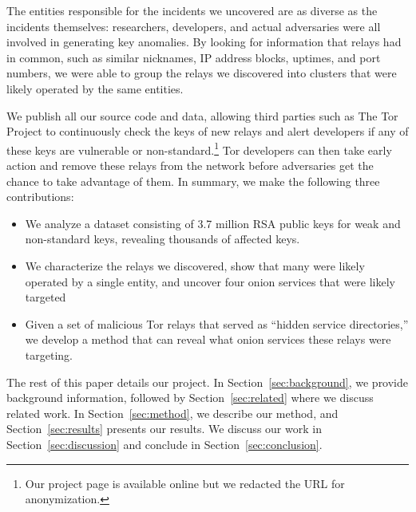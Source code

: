 The entities responsible for the incidents we uncovered are as diverse as the
incidents themselves: researchers, developers, and actual adversaries were all
involved in generating key anomalies.  By looking for information that relays
had in common, such as similar nicknames, IP address blocks, uptimes, and port
numbers, we were able to group the relays we discovered into clusters that were
likely operated by the same entities.

We publish all our source code and data, allowing third parties such as The Tor
Project to continuously check the keys of new relays and alert developers if
any of these keys are vulnerable or non-standard.\footnote{Our project page is
available online but we redacted the URL for anonymization.}  Tor
developers can then take early action and remove these relays from the network
before adversaries get the chance to take advantage of them.  In summary, we
make the following three contributions:
\begin{itemize}
	\item We analyze a dataset consisting of 3.7 million RSA public keys for
		weak and non-standard keys, revealing thousands of affected keys.

	\item We characterize the relays we discovered, show that many were
		likely operated by a single entity, and uncover four onion services that
		were likely targeted

	\item Given a set of malicious Tor relays that served as ``hidden service
		directories,'' we develop a method that can reveal what onion services
		these relays were targeting.
\end{itemize}

The rest of this paper details our project.  In Section~\ref{sec:background}, we
provide background information, followed by Section~\ref{sec:related} where we 
discuss related work.  In Section~\ref{sec:method}, we describe our method,
and Section~\ref{sec:results} presents our results.  We discuss our work in
Section~\ref{sec:discussion} and conclude in Section~\ref{sec:conclusion}.

